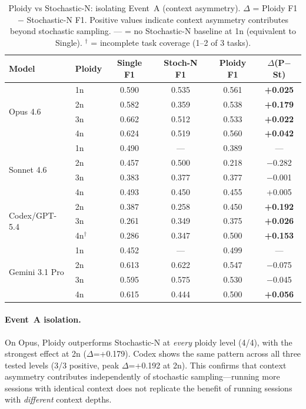 \documentclass[11pt]{article}
\begin{document}
\begin{table}[H]
\centering
\caption{Ploidy vs Stochastic-N: isolating Event~A (context asymmetry). $\Delta$ = Ploidy F1 $-$ Stochastic-N F1. Positive values indicate context asymmetry contributes beyond stochastic sampling. --- = no Stochastic-N baseline at 1n (equivalent to Single). $^\dagger$ = incomplete task coverage (1--2 of 3 tasks).}
\label{tab:ploidy-sweep}
\small
\begin{tabular}{@{}llcccc@{}}
\toprule
\textbf{Model} & \textbf{Ploidy} & \textbf{Single F1} & \textbf{Stoch-N F1} & \textbf{Ploidy F1} & \textbf{$\Delta$(P$-$St)} \\
\midrule
\multirow{4}{*}{Opus 4.6}
  & 1n & 0.590 & 0.535 & 0.561 & \textbf{+0.025} \\
  & 2n & 0.582 & 0.359 & 0.538 & \textbf{+0.179} \\
  & 3n & 0.662 & 0.512 & 0.533 & \textbf{+0.022} \\
  & 4n & 0.624 & 0.519 & 0.560 & \textbf{+0.042} \\
\midrule
\multirow{4}{*}{Sonnet 4.6}
  & 1n & 0.490 & --- & 0.389 & --- \\
  & 2n & 0.457 & 0.500 & 0.218 & $-$0.282 \\
  & 3n & 0.383 & 0.377 & 0.377 & $-$0.001 \\
  & 4n & 0.493 & 0.450 & 0.455 & +0.005 \\
\midrule
\multirow{3}{*}{Codex/GPT-5.4}
  & 2n & 0.387 & 0.258 & 0.450 & \textbf{+0.192} \\
  & 3n & 0.261 & 0.349 & 0.375 & \textbf{+0.026} \\
  & 4n$^\dagger$ & 0.286 & 0.347 & 0.500 & \textbf{+0.153} \\
\midrule
\multirow{4}{*}{Gemini 3.1 Pro}
  & 1n & 0.452 & --- & 0.499 & --- \\
  & 2n & 0.613 & 0.622 & 0.547 & $-$0.075 \\
  & 3n & 0.595 & 0.575 & 0.530 & $-$0.045 \\
  & 4n & 0.615 & 0.444 & 0.500 & \textbf{+0.056} \\
\bottomrule
\end{tabular}
\end{table}

\paragraph{Event~A isolation.} On Opus, Ploidy outperforms Stochastic-N at \emph{every} ploidy level (4/4), with the strongest effect at 2n ($\Delta$=+0.179). Codex shows the same pattern across all three tested levels (3/3 positive, peak $\Delta$=+0.192 at 2n). This confirms that context asymmetry contributes independently of stochastic sampling---running more sessions with identical context does not replicate the benefit of running sessions with \emph{different} context depths.
\end{document}

